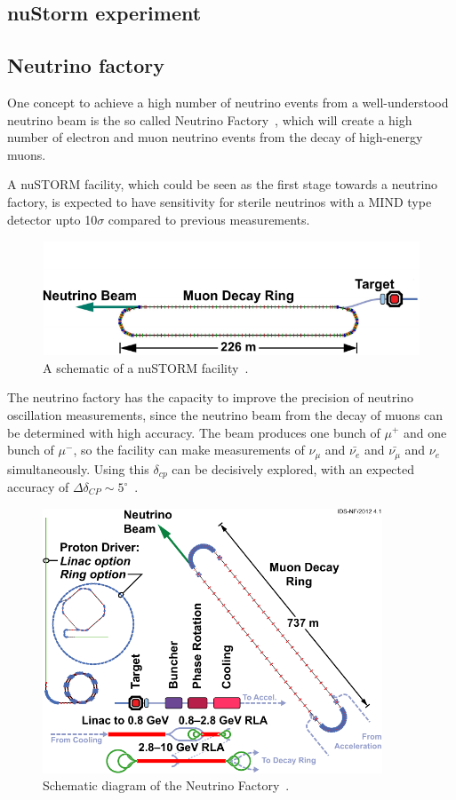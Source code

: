 \subsection{nuStorm experiment}
\subsection{Neutrino factory}
One concept to achieve a high number of neutrino events from a well-understood neutrino beam is the so called Neutrino Factory~\cite{25NUfact}, which will create a high number of electron and muon neutrino events from the decay of high-energy muons.

A nuSTORM facility, which could be seen as the first stage towards a neutrino factory, is expected to have sensitivity for sterile neutrinos with a MIND type detector\cite{29nuSTORM} upto 10$\sigma$ compared to previous measurements.
\begin{figure}[h!]
\centering
\includegraphics[width=\textwidth]{figures/nuSTORM_schematic.pdf}
\caption{A schematic of a nuSTORM facility~\cite{Fix7}.}
\label{fig:nuStorm}
\end{figure}

The neutrino factory has the capacity to improve the precision of neutrino oscillation measurements, since the neutrino beam from the decay of muons can be determined with high accuracy. The beam produces one bunch of $\mu^+$ and one bunch of $\mu^-$, so the facility can make measurements of $\nu_{\mu}$ and $\bar{\nu_{e}}$ and $\bar{\nu_{\mu}}$ and $\nu_{e}$ simultaneously. Using this $\delta_{cp}$ can be decisively explored, with an expected accuracy of $\Delta \delta_{CP}\sim 5^\circ$~\cite{25NUfact}.

\begin{figure}[h!]
\centering
\includegraphics[width=0.9\textwidth]{figures/131112-IDS-NF.pdf}
\caption{Schematic diagram of the Neutrino Factory~\cite{Fix7}.}
\label{fig:nuFact}
\end{figure}

